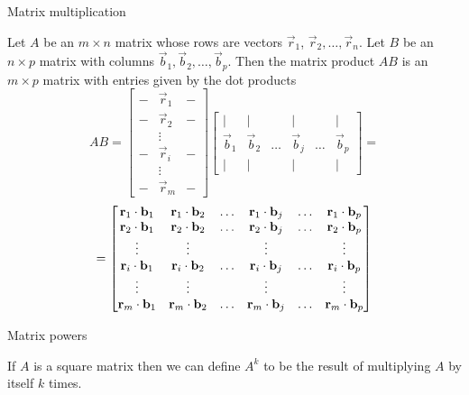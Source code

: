 \documentclass{ximera}
\begin{document}
Matrix multiplication
\begin{expandable}
    Let $A$ be an $m\times n$ matrix whose rows are vectors $\vec{r}_1$, $\vec{r}_2,\ldots ,\vec{r}_n$.  Let $B$ be an $n\times p$ matrix with columns $\vec{b}_1, \vec{b}_2, \ldots, \vec{b}_p$.  Then the matrix product $AB$ is an $m \times p$ matrix with entries given by the dot products
$$AB=\begin{bmatrix}-&\vec{r}_1&-\\-&\vec{r}_2&-\\ &\vdots & \\-&\vec{r}_i &-\\ &\vdots& \\-&\vec{r}_m&-\end{bmatrix}\begin{bmatrix}|&|&&|&&|\\\vec{b}_1& \vec{b}_2 &\ldots  & \vec{b}_j&\ldots& \vec{b}_p\\|&|&&|&&|\end{bmatrix}=$$
$$=\begin{bmatrix}\mathbf{r}_1\cdot \mathbf{b}_1&\mathbf{r}_1\cdot \mathbf{b}_2&\ldots&\mathbf{r}_1\cdot \mathbf{b}_j&\ldots &\mathbf{r}_1\cdot \mathbf{b}_p\\\mathbf{r}_2\cdot \mathbf{b}_1&\mathbf{r}_2\cdot \mathbf{b}_2&\ldots&\mathbf{r}_2\cdot \mathbf{b}_j&\ldots &\mathbf{r}_2\cdot \mathbf{b}_p\\\vdots&\vdots&&\vdots&&\vdots\\\mathbf{r}_i\cdot \mathbf{b}_1&\mathbf{r}_i\cdot \mathbf{b}_2&\ldots&\mathbf{r}_i\cdot \mathbf{b}_j&\ldots &\mathbf{r}_i\cdot \mathbf{b}_p\\\vdots&\vdots&&\vdots&&\vdots\\\mathbf{r}_m\cdot \mathbf{b}_1&\mathbf{r}_m\cdot \mathbf{b}_2&\ldots&\mathbf{r}_m\cdot \mathbf{b}_j&\ldots &\mathbf{r}_m\cdot \mathbf{b}_p\end{bmatrix}
$$
\end{expandable}


Matrix powers
\begin{expandable}
    If $A$ is a square matrix then we can define $A^k$ to be the result of multiplying $A$ by itself $k$ times.
\end{expandable}

\end{document}
